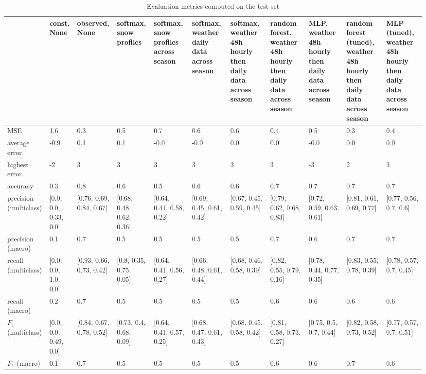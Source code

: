\begin{table}[H]
\caption{Evaluation metrics computed on the test set}
\label{tbl:sais_eval_test}
\begin{tabular}{lllllllllll}
\toprule
 & const, None & observed, None & softmax, snow profiles & softmax, snow profiles across season & softmax, weather daily data across season & softmax, weather 48h hourly then daily data across season & random forest, weather 48h hourly then daily data across season & MLP, weather 48h hourly then daily data across season & random forest (tuned), weather 48h hourly then daily data across season & MLP (tuned), weather 48h hourly then daily data across season \\
\midrule
MSE & 1.6 & 0.3 & 0.5 & 0.7 & 0.6 & 0.6 & 0.4 & 0.5 & 0.3 & 0.4 \\
average error & -0.9 & 0.1 & 0.1 & -0.0 & -0.0 & 0.0 & 0.0 & -0.0 & 0.0 & 0.0 \\
highest error & -2 & 3 & 3 & 3 & 3 & 3 & 3 & -3 & 2 & 3 \\
accuracy & 0.3 & 0.8 & 0.6 & 0.5 & 0.6 & 0.6 & 0.7 & 0.7 & 0.7 & 0.7 \\
precision (multiclass) & [0.0, 0.0, 0.33, 0.0] & [0.76, 0.69, 0.84, 0.67] & [0.68, 0.48, 0.62, 0.36] & [0.64, 0.41, 0.58, 0.22] & [0.69, 0.45, 0.61, 0.42] & [0.67, 0.45, 0.59, 0.45] & [0.79, 0.62, 0.68, 0.83] & [0.72, 0.59, 0.63, 0.61] & [0.81, 0.61, 0.69, 0.77] & [0.77, 0.56, 0.7, 0.6] \\
precision (macro) & 0.1 & 0.7 & 0.5 & 0.5 & 0.5 & 0.5 & 0.7 & 0.6 & 0.7 & 0.7 \\
recall (multiclass) & [0.0, 0.0, 1.0, 0.0] & [0.93, 0.66, 0.73, 0.42] & [0.8, 0.35, 0.75, 0.05] & [0.64, 0.41, 0.56, 0.27] & [0.66, 0.48, 0.61, 0.44] & [0.68, 0.46, 0.58, 0.39] & [0.82, 0.55, 0.79, 0.16] & [0.78, 0.44, 0.77, 0.35] & [0.83, 0.55, 0.78, 0.39] & [0.78, 0.57, 0.7, 0.45] \\
recall (macro) & 0.2 & 0.7 & 0.5 & 0.5 & 0.5 & 0.5 & 0.6 & 0.6 & 0.6 & 0.6 \\
$F_1$ (multiclass) & [0.0, 0.0, 0.49, 0.0] & [0.84, 0.67, 0.78, 0.52] & [0.73, 0.4, 0.68, 0.09] & [0.64, 0.41, 0.57, 0.25] & [0.68, 0.47, 0.61, 0.43] & [0.68, 0.45, 0.58, 0.42] & [0.81, 0.58, 0.73, 0.27] & [0.75, 0.5, 0.7, 0.44] & [0.82, 0.58, 0.73, 0.52] & [0.77, 0.57, 0.7, 0.51] \\
$F_1$ (macro) & 0.1 & 0.7 & 0.5 & 0.5 & 0.5 & 0.5 & 0.6 & 0.6 & 0.7 & 0.6 \\
\bottomrule
\end{tabular}
\end{table}
